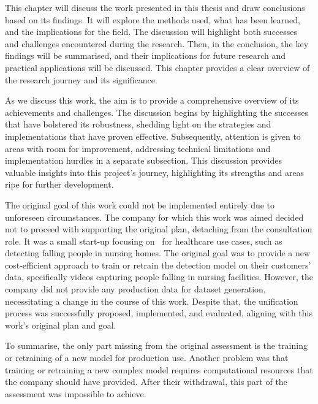 
This chapter will discuss the work presented in this thesis and draw conclusions based on its findings. It will explore the methods used, what has been learned, and the implications for the field. The discussion will highlight both successes and challenges encountered during the research. Then, in the conclusion, the key findings will be summarised, and their implications for future research and practical applications will be discussed. This chapter provides a clear overview of the research journey and its significance.

As we discuss this work, the aim is to provide a comprehensive overview of its achievements and challenges. The discussion begins by highlighting the successes that have bolstered its robustness, shedding light on the strategies and implementations that have proven effective. Subsequently, attention is given to areas with room for improvement, addressing technical limitations and implementation hurdles in a separate subsection. This discussion provides valuable insights into this project's journey, highlighting its strengths and areas ripe for further development.

The original goal of this work could not be implemented entirely due to unforeseen circumstances. The company for which this work was aimed decided not to proceed with supporting the original plan, detaching from the consultation role. It was a small start-up focusing on \HPE\ for healthcare use cases, such as detecting falling people in nursing homes. The original goal was to provide a new cost-efficient approach to train or retrain the detection model on their customers' data, specifically videos capturing people falling in nursing facilities. However, the company did not provide any production data for dataset generation, necessitating a change in the course of this work. Despite that, the unification process was successfully proposed, implemented, and evaluated, aligning with this work's original plan and goal.

To summarise, the only part missing from the original assessment is the training or retraining of a new model for production use. Another problem was that training or retraining a new complex model requires computational resources that the company should have provided. After their withdrawal, this part of the assessment was impossible to achieve.

